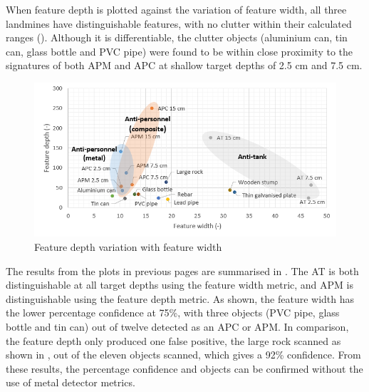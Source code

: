 \documentclass[main.tex]{subfiles}
\begin{document}
When feature depth is plotted against the variation of feature width, all three landmines have distinguishable features, with no clutter within their calculated ranges (). Although it is differentiable, the clutter objects (aluminium can, tin can, glass bottle and PVC pipe) were found to be within close proximity to the signatures of both APM and APC at shallow target depths of 2.5 cm and 7.5 cm.

\begin{figure}[!ht]
\includegraphics[width=\textwidth]{5-Testing/depthWidth.PNG}
\centering
\caption{Feature depth variation with feature width}
\end{figure}

The results from the plots in previous pages are summarised in . The AT is both distinguishable at all target depths using the feature width metric, and APM is distinguishable using the feature depth metric. As shown, the feature width has the lower percentage confidence at 75\%, with three objects (PVC pipe, glass bottle and tin can) out of twelve detected as an APC or APM. In comparison, the feature depth only produced one false positive, the large rock scanned as shown in , out of the eleven objects scanned, which gives a 92\% confidence. From these results, the percentage confidence and objects can be confirmed without the use of metal detector metrics. 
\end{document}
